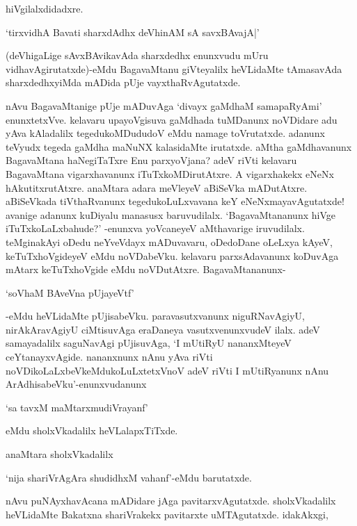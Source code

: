 hiVgilalxdidadxre.

\begin{shloka}
`tirxvidhA Bavati sharxdAdhx deVhinAM sA savxBAvajA|'
\end{shloka} 

(deVhigaLige sAvxBAvikavAda sharxdedhx enunxvudu mUru vidhavAgirutatxde)-eMdu BagavaMtanu giVteyalilx heVLidaMte tAmasavAda sharxdedhxyiMda mADida pUje vayxthaRvAgutatxde.

nAvu BagavaMtanige pUje mADuvAga `divayx gaMdhaM samapaRyAmi' enunxtetxVve. kelavaru upayoVgisuva gaMdhada tuMDanunx noVDidare adu yAva kAladalilx tegedukoMDududoV eMdu namage toVrutatxde. adanunx teVyudx tegeda gaMdha maNuNX kalasidaMte irutatxde. aMtha gaMdhavanunx BagavaMtana haNegiTaTxre Enu parxyoVjana? adeV riVti kelavaru BagavaMtana vigarxhavanunx iTuTxkoMDirutAtxre. A vigarxhakekx eNeNx hAkutitxrutAtxre. anaMtara adara meVleyeV aBiSeVka mADutAtxre. aBiSeVkada tiVthaRvanunx tegedukoLuLxvavana keY eNeNxmayavAgutatxde! avanige adanunx kuDiyalu manasusx baruvudilalx. `BagavaMtananunx hiVge iTuTxkoLaLxbahude?' -enunxva yoVcaneyeV aMthavarige iruvudilalx. teMginakAyi oDedu neYveVdayx mADuvavaru, oDedoDane oLeLxya kAyeV, keTuTxhoVgideyeV eMdu noVDabeVku. kelavaru parxsAdavanunx koDuvAga mAtarx keTuTxhoVgide eMdu noVDutAtxre. BagavaMtananunx-

\begin{shloka}
`soV\s haM BAveVna pUjayeVtf'
\end{shloka}

-eMdu heVLidaMte pUjisabeVku. paravasutxvanunx niguRNavAgiyU, nirAkAravAgiyU ciMtisuvAga eraDaneya vasutxvenunxvudeV ilalx. adeV samayadalilx saguNavAgi pUjisuvAga, `I mUtiRyU nananxMteyeV ceYtanayxvAgide. nananxnunx nAnu yAva riVti noVDikoLaLxbeVkeMdukoLuLxtetxVnoV adeV riVti I mUtiRyanunx nAnu ArAdhisabeVku'-enunxvudanunx

\begin{shloka}
`sa tavxM maMtarxmudiVrayanf'
\end{shloka}

eMdu sholxVkadalilx heVLalapxTiTxde.

anaMtara sholxVkadalilx 

\begin{shloka}
`nija shariVrAgAra shudidhxM vahanf'-eMdu barutatxde.
\end{shloka}

nAvu puNAyxhavAcana mADidare jAga pavitarxvAgutatxde. sholxVkadalilx heVLidaMte Bakatxna shariVrakekx pavitarxte uMTAgutatxde. idakAkxgi,

